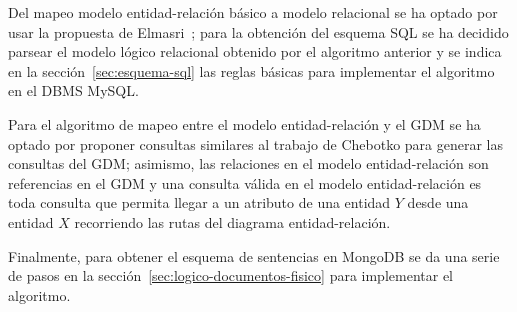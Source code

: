 Del mapeo modelo entidad-relación básico a modelo relacional se ha optado por usar la propuesta de Elmasri~\cite{ramez_elmasri_fundamentos_nodate}; para la obtención del esquema SQL se ha decidido parsear el modelo lógico relacional obtenido por el algoritmo anterior y se indica en la sección~\ref{sec:esquema-sql} las reglas básicas para implementar el algoritmo en el DBMS MySQL.


Para el algoritmo de mapeo entre el modelo entidad-relación y el GDM se ha optado por proponer consultas similares al trabajo de Chebotko\cite{chebotko_big_2015} para generar las consultas del GDM; asimismo, las relaciones en el modelo entidad-relación son referencias en el GDM y una consulta válida en el modelo entidad-relación es toda consulta que permita llegar a un atributo de una entidad $Y$ desde una entidad $X$ recorriendo las rutas del diagrama entidad-relación.




Finalmente, para obtener el esquema de sentencias en MongoDB se da una serie de pasos en la sección~\ref{sec:logico-documentos-fisico} para implementar el algoritmo.